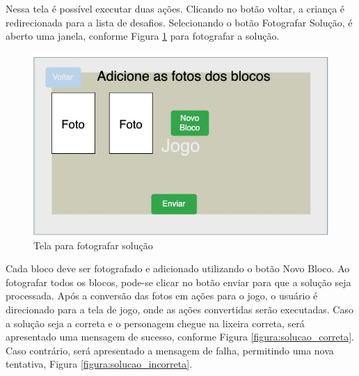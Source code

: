     Nessa tela é possível executar duas ações.
    Clicando no botão voltar, a criança é redirecionada para a lista de desafios.
    Selecionando o botão Fotografar Solução, é aberto uma janela, conforme Figura \ref{figura:fotografar_blocos} para fotografar a solução.
    
    \begin{figure}[H]
        \caption{Tela para fotografar solução}
        \begin{center}
            \includegraphics[width=\linewidth]{Imagens/cap3/Fotografar_blocos.jpg}
        \end{center}
        \label{figura:fotografar_blocos}
    \end{figure}
    
    Cada bloco deve ser fotografado e adicionado utilizando o botão Novo Bloco.
    Ao fotografar todos os blocos, pode-se clicar no botão enviar para que a solução seja processada.
    Após a conversão das fotos em ações para o jogo, o usuário é direcionado para a tela de jogo, onde as ações convertidas serão executadas.
    Caso a solução seja a correta e o personagem chegue na lixeira correta, será apresentado uma mensagem de sucesso, conforme Figura \ref{figura:solucao_correta}. Caso contrário, será apresentado a mensagem de falha, permitindo uma nova tentativa, Figura \ref{figura:solucao_incorreta}.
    
